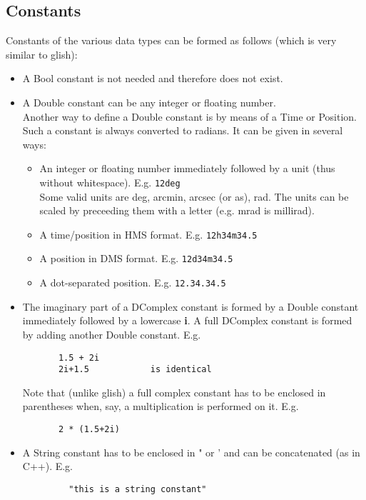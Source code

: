 \subsection{Constants}
Constants of the various data types can be formed as follows
(which is very similar to glish):
\begin{itemize}
  \item A Bool constant is not needed and therefore does not exist.
  \item A Double constant can be any integer or floating number.
       \\Another way to define a Double constant is by means of
       a Time or Position. Such a constant is always converted to radians.
       It can be given in several ways:
       \begin{itemize}
         \item An integer or floating number immediately followed by a unit
              (thus without whitespace). E.g. \texttt{12deg}
              \\Some valid units are deg, arcmin, arcsec (or as), rad.
              The units can be scaled by preceeding them with a letter
              (e.g. mrad is millirad).
         \item A time/position in HMS format.
              E.g. \texttt{12h34m34.5}
         \item A position in DMS format.
              E.g. \texttt{12d34m34.5}
         \item A dot-separated position.
              E.g. \texttt{12.34.34.5}
       \end{itemize}
  \item The imaginary part of a DComplex constant is formed by a Double
       constant immediately followed by a lowercase \textbf{i}. A full DComplex
       constant is formed by adding another Double constant. E.g.
       \begin{verbatim}
       1.5 + 2i
       2i+1.5            is identical
       \end{verbatim}
       Note that (unlike glish) a full complex constant has to be enclosed
       in parentheses when, say, a multiplication is performed on it. E.g.
       \begin{verbatim}
       2 * (1.5+2i)
       \end{verbatim}
  \item A String constant has to be enclosed in " or ' and can be
       concatenated (as in C++). E.g.
       \begin{verbatim}
         "this is a string constant"

\end{verbatim}
\end{itemize}
